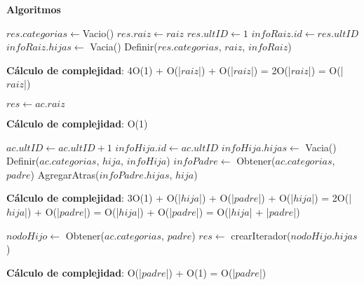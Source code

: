 \documentclass[10pt, a4paper]{article}
\let\TipoVariable=\texttt
\let\ModificadorArgumento=\textbf
\newcommand{\In}[2]{\ModificadorArgumento{in} \ensuremath{#1}\,: \TipoVariable{#2}\xspace}
\newcommand{\Inout}[2]{\ModificadorArgumento{in/out} \ensuremath{#1}\,: \TipoVariable{#2}\xspace}
\newenvironment{Servicios Usados}{%
  \vspace*{2ex}
  \noindent\textbf{\Large Servicios Usados}%
  \vspace*{2ex}
}{}
\newenvironment{Algoritmos}{%
  \vspace*{2ex}%
  \noindent\textbf{\Large Algoritmos}%
  \vspace*{2ex}%
}{}
\newcommand{\DRef}{\ensuremath{\rightarrow}}
\begin{document}
\begin{Algoritmos}

\begin{algorithm}[H]
\caption*{iNuevoAC(\In{raiz}{categoria}) $\DRef res$ : \TipoVariable{abCat}}
\begin{algorithmic}[1]
	\State $res.categorias \gets $Vacio()
	\State $res.raiz\gets raiz$
	\State $res.ultID\gets 1$
	\Statex
	\State $infoRaiz.id \gets res.ultID$
	\State $infoRaiz.hijas \gets$ Vacia()
	\State Definir($res.categorias$, $raiz$, $infoRaiz$)
\end{algorithmic}
\textbf{C\'alculo de complejidad}: 4O(1) + O(|$raiz$|) + O(|$raiz$|) = 2O(|$raiz$|) = O(|$raiz$|)
\end{algorithm}

\begin{algorithm}[H]
\caption*{iRaiz(\In{ac}{abCat}) $\DRef res$ : \TipoVariable{categoria}}
\begin{algorithmic}[1]
	\State $res \gets ac.raiz$
\end{algorithmic}
\textbf{C\'alculo de complejidad}: O(1)
\end{algorithm}

\begin{algorithm}[H]
\caption*{iAgregar(\Inout{ac}{abCat}, \In{padre}{categoria}, \In{hija}{categoria})}
\begin{algorithmic}[1]
	\State $ac.ultID \gets ac.ultID + 1$
	\Statex
	\State $infoHija.id \gets ac.ultID$
	\State $infoHija.hijas \gets$ Vacia()
	\State Definir($ac.categorias$, $hija$, $infoHija$)
	\Statex
	\State $infoPadre \gets$ Obtener($ac.categorias$, $padre$)
	\State AgregarAtras($infoPadre.hijas$, $hija$)
\end{algorithmic}
\textbf{C\'alculo de complejidad}: 3O(1) + O(|$hija$|) + O(|$padre$|) + O(|$hija$|) = 2O(|$hija$|) + O(|$padre$|) = O(|$hija$|) + O(|$padre$|) = O(|$hija$| + |$padre$|)
\end{algorithm}

\begin{algorithm}[H]
\caption*{iHijas(\In{ac}{abCat}, \In{padre}{categoria}) $\DRef res$ : \TipoVariable{iteradorUni(categoria)}}
\begin{algorithmic}[1]
	\State $nodoHijo \gets$ Obtener($ac.categorias$, $padre$)
	\State $res \gets$ crearIterador($nodoHijo.hijas$)
\end{algorithmic}
\textbf{C\'alculo de complejidad}: O(|$padre$|) + O(1) = O(|$padre$|)
\end{algorithm}


\end{Algoritmos}
\end{document}
